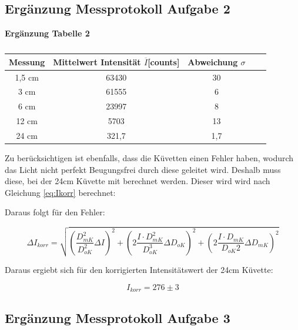 \subsection{Ergänzung Messprotokoll Aufgabe 2}
\begin{table}[h!]
    \centering
    \textbf{Ergänzung Tabelle 2} \\ \smallskip
    \begin{tabular}{c c c c c}
        
        \toprule 
        Messung & Mittelwert Intensität $\overline{I}$[counts] & Abweichung $\sigma$\\
        \midrule
        1,5 cm & 63430 & 30 \\
        3 cm & 61555 & 6 \\
        6 cm & 23997 & 8 \\
        12 cm & 5703 & 13 \\
        24 cm & 321,7 & 1,7 \\
        \bottomrule
        
    \end{tabular}
    \caption{}
\end{table}

Zu berücksichtigen ist ebenfalls, dass die Küvetten einen
Fehler haben, wodurch das Licht nicht perfekt Beugungsfrei
durch diese geleitet wird. Deshalb muss diese, bei der 24cm Küvette mit berechnet werden. Dieser wird wird nach Gleichung \ref{eq:Ikorr} berechnet:

Daraus folgt für den Fehler:

\begin{equation}
    \Delta I_{korr} = \sqrt{(\frac{D_{mK}^2}{D_{oK}^2} \Delta I)^2 + (2\frac{I \cdot D_{mK}^2}{D_{oK}^3}\Delta D_{oK})^2 + (2 \frac{I \cdot D_{mK}}{D_{oK}2} \Delta D_{mK})^2}
\end{equation}

Daraus ergiebt sich für den korrigierten Intensitätswert der 24cm Küvette:

\[ I_{korr} = 276 \pm 3 \]

\subsection{Ergänzung Messprotokoll Aufgabe 3}

